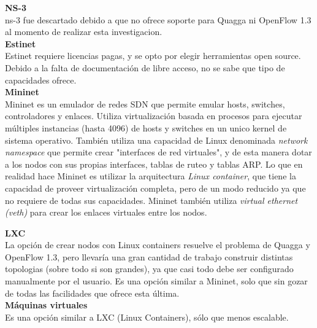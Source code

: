 \textbf{NS-3}\\
ns-3 fue descartado debido a que no ofrece soporte para Quagga ni OpenFlow 1.3 al momento de realizar esta investigacion.\\

\textbf{Estinet}\\
Estinet requiere licencias pagas, y se opto por elegir herramientas open source. Debido a la falta de documentación de libre acceso, no se sabe que tipo de capacidades ofrece.\\

\textbf{Mininet}\\
Mininet es un emulador de redes SDN que permite emular hosts, switches, controladores y enlaces. Utiliza virtualización basada en procesos para ejecutar múltiples instancias (hasta 4096) de hosts y switches en un unico kernel de sistema operativo. También utiliza una capacidad de Linux denominada \textit{network namespace} que permite crear "interfaces de red virtuales", y de esta manera dotar a los nodos con sus propias interfaces, tablas de ruteo y tablas ARP. Lo que en realidad hace Mininet es utilizar la arquitectura \textit{Linux container}, que tiene la capacidad de proveer virtualización completa, pero de un modo reducido ya que no requiere de todas sus capacidades. Mininet también utiliza \textit{virtual ethernet (veth)} para crear los enlaces virtuales entre los nodos.


\textbf{LXC}\\
La opción de crear nodos con Linux containers resuelve el problema de Quagga y OpenFlow 1.3, pero llevaría una gran cantidad de trabajo construir distintas topologias (sobre todo si son grandes), ya que casi todo debe ser configurado manualmente por el usuario. Es una opción similar a Mininet, solo que sin gozar de todas las facilidades que ofrece esta última.\\


\textbf{Máquinas virtuales}\\
Es una opción similar a LXC (Linux Containers), sólo que menos escalable.
\\